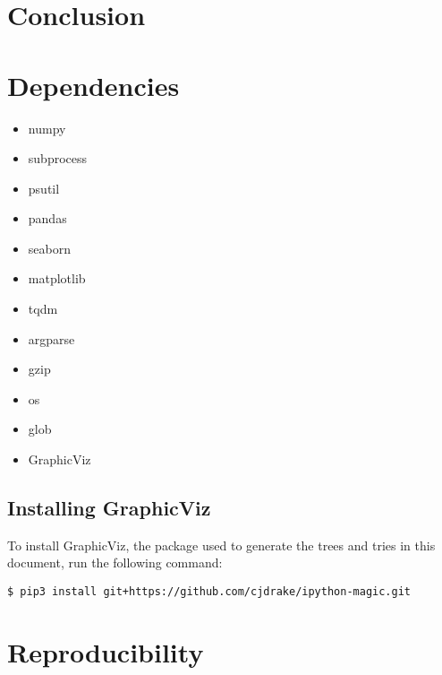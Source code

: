 \documentclass[11pt, letterpaper]{article}
\begin{document}
\subsection{}

\subsection{}


\subsection{}

\section{Conclusion}

\section{Dependencies}
\begin{itemize}
  \item numpy
  \item subprocess
  \item psutil
  \item pandas
  \item seaborn
  \item matplotlib
  \item tqdm
  \item argparse
  \item gzip
  \item os 
  \item glob
  \item GraphicViz
\end{itemize}

\subsection{Installing GraphicViz}
To install GraphicViz, the package used to generate the trees and tries in this document, run the following command:
\begin{verbatim}
$ pip3 install git+https://github.com/cjdrake/ipython-magic.git
\end{verbatim}

\newpage

\section{Reproducibility}
\end{document}

